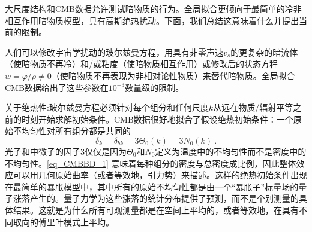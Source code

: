 
大尺度结构和CMB数据允许测试暗物质的行为。全局拟合更倾向于最简单的冷非相互作用暗物质模型，具有高斯绝热扰动。下面，我们总结这意味着什么并提出当前的限制。

人们可以修改宇宙学扰动的玻尔兹曼方程，用具有非零声速$v_s$的更复杂的暗流体（使暗物质不再冷）和/或粘度（使暗物质相互作用）或修改后的状态方程$w = \varphi/\rho \neq 0$（使暗物质不再表现为非相对论性物质）来替代暗物质。全局拟合CMB数据给出了这些参数在$10^{-3}$数量级的限制。

关于绝热性:玻尔兹曼方程必须针对每个组分和任何尺度$k$从远在物质/辐射平等之前的时刻开始求解初始条件。CMB数据很好地拟合了假设绝热初始条件：一个原始不均匀性对所有组分都是共同的
\begin{equation}\label{eq_CMBBD_1}
\delta_k = \delta_{bk} = 3\Theta_0(k) = 3N_0(k)~.
\end{equation}
光子和中微子的因子$3$仅仅是因为$\Theta_0$和$N_0$定义为温度中的不均匀性而不是密度中的不均匀性。\autoref{eq_CMBBD_1} 意味着每种组分的密度与总密度成比例，因此整体效应可以用几何原始曲率（或者等效地，引力势）来描述。这样的绝热初始条件出现在最简单的暴胀模型中，其中所有的原始不均匀性都是由一个“暴胀子”标量场的量子涨落产生的。量子力学为这些涨落的统计分布提供了预测，而不是个别测量的具体结果。这就是为什么所有可观测量都是在空间上平均的，或者等效地，在具有不同取向的傅里叶模式上平均。

